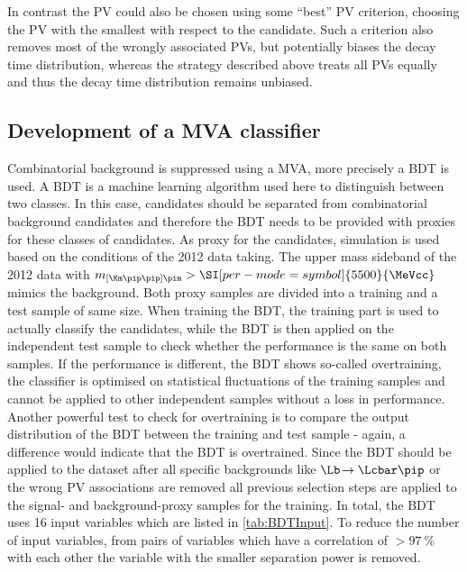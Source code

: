 In contrast the \ac{PV} could also be chosen using some \enquote{best} \ac{PV} criterion, \eg choosing the \ac{PV} with the smallest \chisqip with respect to the \Bz candidate.
Such a criterion also removes most of the wrongly associated \ac{PV}s, but potentially biases the decay time distribution, whereas the strategy described above treats all \ac{PV}s equally and thus the decay time distribution remains unbiased.

\subsection{Development of a MVA classifier}
\label{sec:MVADev}

Combinatorial background is suppressed using a \ac{MVA}, more precisely a \ac{BDT} is used.
A \ac{BDT} is a machine learning algorithm used here to distinguish between two classes.
In this case, \BdToDpi candidates should be separated from combinatorial background candidates and therefore the BDT needs to be provided with proxies for these classes of candidates.
As proxy for the \BdToDpi candidates, simulation is used based on the conditions of the \num{2012} data taking.
The upper mass sideband of the \num{2012} data with $m_{\left[\Km\pip\pip\right]\pim}>\SI[per-mode=symbol]{5500}{\MeVcc}$ mimics the background.
Both proxy samples are divided into a training and a test sample of same size.
When training the \ac{BDT}, the training part is used to actually classify the candidates, while the \ac{BDT} is then applied on the independent test sample to check whether the performance is the same on both samples.
If the performance is different, the \ac{BDT} shows so-called overtraining, \ie the classifier is optimised on statistical fluctuations of the training samples and cannot be applied to other independent samples without a loss in performance.
Another powerful test to check for overtraining is to compare the output distribution of the \ac{BDT} between the training and test sample - again, a difference would indicate that the \ac{BDT} is overtrained.
Since the \ac{BDT} should be applied to the dataset after all specific backgrounds like $\Lb\!\to\Lcbar\pip$ or the wrong PV associations are removed all previous selection steps are applied to the signal- and background-proxy samples for the training.
In total, the \ac{BDT} uses \num{16} input variables which are listed in \cref{tab:BDTInput}.
To reduce the number of input variables, from pairs of variables which have a correlation of $>\SI{97}{\percent}$ with each other the variable with the smaller separation power is removed.
